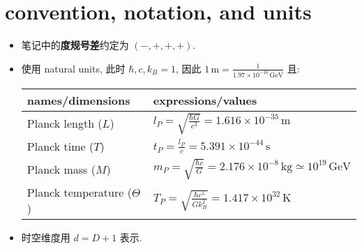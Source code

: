 \chapter*{convention, notation, and units}
\begin{itemize}
	\item 笔记中的\textbf{度规号差}约定为 $\boldsymbol{(-, +, +, +)}$.
	
	\item 使用 natural units, 此时 $\hbar, c, k_B = 1$, 因此 $1 \, \text{m} = \frac{1}{1.97 \times 10^{- 16} \, \text{GeV}}$ 且:
	
	\begin{center}
		\begin{tabularx}{\linewidth}{XX}
			\toprule 
			names/dimensions & expressions/values \\
			\midrule 
			Planck length ($L$) & $l_P = \sqrt{\frac{\hbar G}{c^3}} = 1.616 \times 10^{- 35} \, \text{m}$ \\
			Planck time ($T$) & $t_P = \frac{l_P}{c} = 5.391 \times 10^{- 44} \, \text{s}$ \\
			Planck mass ($M$) & $m_P = \sqrt{\frac{\hbar c}{G}} = 2.176 \times 10^{- 8} \, \text{kg} \simeq 10^{19} \, \text{GeV}$ \\
			Planck temperature ($\Theta$) & $T_P = \sqrt{\frac{\hbar c^5}{G k_B^2}} = 1.417 \times 10^{32} \, \text{K}$ \\
			\bottomrule
		\end{tabularx}
	\end{center}
	
	\item 时空维度用 $d = D + 1$ 表示.
\end{itemize}
